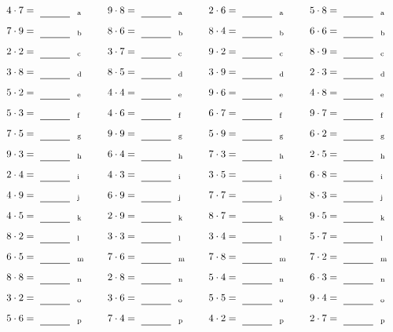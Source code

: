 \documentclass
[
  draft    = true,
  fontsize = 11pt,
  parskip  = half-
]
{scrartcl}
\begin{document}
\par\vfill\par
\begin{align*}
    \pline{4\cdot7}&=\rline{a}
  & \pline{9\cdot8}&=\rline{a}
  & \pline{2\cdot6}&=\rline{a}
  & \pline{5\cdot8}&=\rline{a} \\[1ex]
    \pline{7\cdot9}&=\rline{b}
  & \pline{8\cdot6}&=\rline{b}
  & \pline{8\cdot4}&=\rline{b}
  & \pline{6\cdot6}&=\rline{b} \\[1ex]
    \pline{2\cdot2}&=\rline{c}
  & \pline{3\cdot7}&=\rline{c}
  & \pline{9\cdot2}&=\rline{c}
  & \pline{8\cdot9}&=\rline{c} \\[1ex]
    \pline{3\cdot8}&=\rline{d}
  & \pline{8\cdot5}&=\rline{d}
  & \pline{3\cdot9}&=\rline{d}
  & \pline{2\cdot3}&=\rline{d} \\[1ex]
    \pline{5\cdot2}&=\rline{e}
  & \pline{4\cdot4}&=\rline{e}
  & \pline{9\cdot6}&=\rline{e}
  & \pline{4\cdot8}&=\rline{e} \\[1ex]
    \pline{5\cdot3}&=\rline{f}
  & \pline{4\cdot6}&=\rline{f}
  & \pline{6\cdot7}&=\rline{f}
  & \pline{9\cdot7}&=\rline{f} \\[1ex]
    \pline{7\cdot5}&=\rline{g}
  & \pline{9\cdot9}&=\rline{g}
  & \pline{5\cdot9}&=\rline{g}
  & \pline{6\cdot2}&=\rline{g} \\[1ex]
    \pline{9\cdot3}&=\rline{h}
  & \pline{6\cdot4}&=\rline{h}
  & \pline{7\cdot3}&=\rline{h}
  & \pline{2\cdot5}&=\rline{h} \\[1ex]
    \pline{2\cdot4}&=\rline{i}
  & \pline{4\cdot3}&=\rline{i}
  & \pline{3\cdot5}&=\rline{i}
  & \pline{6\cdot8}&=\rline{i} \\[1ex]
    \pline{4\cdot9}&=\rline{j}
  & \pline{6\cdot9}&=\rline{j}
  & \pline{7\cdot7}&=\rline{j}
  & \pline{8\cdot3}&=\rline{j} \\[1ex]
    \pline{4\cdot5}&=\rline{k}
  & \pline{2\cdot9}&=\rline{k}
  & \pline{8\cdot7}&=\rline{k}
  & \pline{9\cdot5}&=\rline{k} \\[1ex]
    \pline{8\cdot2}&=\rline{l}
  & \pline{3\cdot3}&=\rline{l}
  & \pline{3\cdot4}&=\rline{l}
  & \pline{5\cdot7}&=\rline{l} \\[1ex]
    \pline{6\cdot5}&=\rline{m}
  & \pline{7\cdot6}&=\rline{m}
  & \pline{7\cdot8}&=\rline{m}
  & \pline{7\cdot2}&=\rline{m} \\[1ex]
    \pline{8\cdot8}&=\rline{n}
  & \pline{2\cdot8}&=\rline{n}
  & \pline{5\cdot4}&=\rline{n}
  & \pline{6\cdot3}&=\rline{n} \\[1ex]
    \pline{3\cdot2}&=\rline{o}
  & \pline{3\cdot6}&=\rline{o}
  & \pline{5\cdot5}&=\rline{o}
  & \pline{9\cdot4}&=\rline{o} \\[1ex]
    \pline{5\cdot6}&=\rline{p}
  & \pline{7\cdot4}&=\rline{p}
  & \pline{4\cdot2}&=\rline{p}
  & \pline{2\cdot7}&=\rline{p}
\end{align*}
\end{document}
